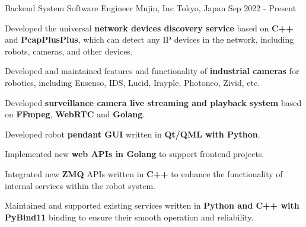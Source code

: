
\vspace{-2mm}

\begin{cventries}

  \cventry
    {Backend System Software Engineer} %
    {Mujin, Inc} %
    {Tokyo, Japan} %
    {Sep 2022 - Present} %
    {
      \begin{cvitems} %
        \item {Developed the universal \textbf{network devices discovery service} based on \textbf{C++} and \textbf{PcapPlusPlus}, which can detect any IP devices in the network, including robots, cameras, and other devices.}
        \item {Developed and maintained features and functionality of \textbf{industrial cameras} for robotics, including Ensenso, IDS, Lucid, Irayple, Photoneo, Zivid, etc.}
        \item {Developed \textbf{surveillance camera live streaming and playback system} based on \textbf{FFmpeg}, \textbf{WebRTC} and \textbf{Golang}.}
        \item {Developed robot \textbf{pendant GUI} written in \textbf{Qt/QML with Python}.}
        \item {Implemented new \textbf{web APIs in Golang} to support frontend projects.}
        \item {Integrated new \textbf{ZMQ} APIs written in  \textbf{C++} to enhance the functionality of internal services within the robot system.}
        \item {Maintained and supported existing services written in  \textbf{Python and C++ with PyBind11} binding to ensure their smooth operation and reliability.}
      \end{cvitems}
    }

    \vspace{-2mm}


\end{cventries}

